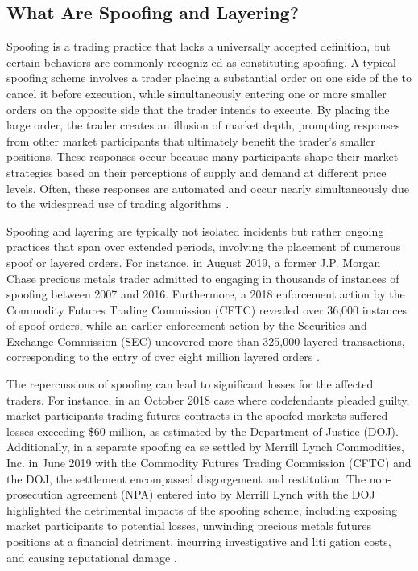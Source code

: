 \subsection{What Are Spoofing and Layering?}
Spoofing is a trading practice that lacks a universally accepted definition, but certain behaviors are commonly recogniz
ed as constituting spoofing. A typical spoofing scheme involves a trader placing a substantial order on one side of the
to cancel it before execution, while simultaneously entering one or more smaller orders on the opposite side that the trader
intends to execute. By placing the large order, the trader creates an illusion of market depth, prompting responses from
other market participants that ultimately benefit the trader's smaller positions. These responses occur because many participants
shape their market strategies based on their perceptions of supply and demand at different price levels. Often, these
responses are automated and occur nearly simultaneously due to the widespread use of trading algorithms
\cite{corwin2012large, jarrow2011manipulation}.

Spoofing and layering are typically not isolated incidents but rather ongoing practices that span over extended periods,
involving the placement of numerous spoof or layered orders. For instance, in August 2019, a former J.P. Morgan Chase
precious metals trader admitted to engaging in thousands of instances of spoofing between 2007 and 2016. Furthermore, a
2018 enforcement action by the Commodity Futures Trading Commission (CFTC) revealed over 36,000 instances of spoof orders,
while an earlier enforcement action by the Securities and Exchange Commission (SEC) uncovered more than 325,000 layered
transactions, corresponding to the entry of over eight million layered orders \cite{cftc2018spoofing, sec2015spoofing}.

The repercussions of spoofing can lead to significant losses for the affected traders. For instance, in an October 2018
case where codefendants pleaded guilty, market participants trading futures contracts in the spoofed markets suffered
losses exceeding \$60 million, as estimated by the Department of Justice (DOJ). Additionally, in a separate spoofing ca
se settled by Merrill Lynch Commodities, Inc. in June 2019 with the Commodity Futures Trading Commission (CFTC) and the
DOJ, the settlement encompassed disgorgement and restitution. The non-prosecution agreement (NPA) entered into by Merrill
Lynch with the DOJ highlighted the detrimental impacts of the spoofing scheme, including exposing market participants to
potential losses, unwinding precious metals futures positions at a financial detriment, incurring investigative and liti
gation costs, and causing reputational damage \cite{doj2018spoofing, cftc2019merrill}.

